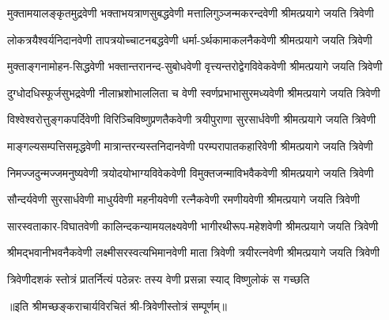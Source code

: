 
\twolineshloka
{मुक्तामयालङ्कृतमुद्रवेणी भक्ताभयत्राणसुबद्धवेणी}
{मत्तालिगुञ्जन्मकरन्दवेणी श्रीमत्प्रयागे जयति त्रिवेणी}%

\twolineshloka
{लोकत्रयैश्वर्यनिदानवेणी तापत्रयोच्चाटनबद्धवेणी}
{धर्मा-ऽर्थकामाकलनैकवेणी श्रीमत्प्रयागे जयति त्रिवेणी}%

\twolineshloka
{मुक्ताङ्गनामोहन-सिद्धवेणी भक्तान्तरानन्द-सुबोधवेणी}
{वृत्त्यन्तरोद्वेगविवेकवेणी श्रीमत्प्रयागे जयति त्रिवेणी}%

\twolineshloka
{दुग्धोदधिस्फूर्जसुभद्रवेणी नीलाभ्रशोभाललिता च वेणी}
{स्वर्णप्रभाभासुरमध्यवेणी श्रीमत्प्रयागे जयति त्रिवेणी}%

\twolineshloka
{विश्वेश्वरोत्तुङ्गकपर्दिवेणी विरिञ्चिविष्णुप्रणतैकवेणी}
{त्रयीपुराणा सुरसार्धवेणी श्रीमत्प्रयागे जयति त्रिवेणी}%

\twolineshloka
{माङ्गल्यसम्पत्तिसमृद्धवेणी मात्रान्तरन्यस्तनिदानवेणी}
{परम्परापातकहारिवेणी श्रीमत्प्रयागे जयति त्रिवेणी}%

\twolineshloka
{निमज्जदुन्मज्जमनुष्यवेणी त्रयोदयोभाग्यविवेकवेणी}
{विमुक्तजन्माविभवैकवेणी श्रीमत्प्रयागे जयति त्रिवेणी}%

\twolineshloka
{सौन्दर्यवेणी सुरसार्धवेणी माधुर्यवेणी महनीयवेणी}
{रत्नैकवेणी रमणीयवेणी श्रीमत्प्रयागे जयति त्रिवेणी}%

\twolineshloka
{सारस्वताकार-विघातवेणी कालिन्दकन्यामयलक्ष्यवेणी}
{भागीरथीरूप-महेशवेणी श्रीमत्प्रयागे जयति त्रिवेणी}%

\twolineshloka
{श्रीमद्भवानीभवनैकवेणी लक्ष्मीसरस्वत्यभिमानवेणी}
{माता त्रिवेणी त्रयीरत्नवेणी श्रीमत्प्रयागे जयति त्रिवेणी}%

\twolineshloka
{त्रिवेणीदशकं स्तोत्रं प्रातर्नित्यं पठेन्नरः}
{तस्य वेणी प्रसन्ना स्याद् विष्णुलोकं स गच्छति}%

॥इति श्रीमच्छङ्कराचार्यविरचितं श्री-त्रिवेणीस्तोत्रं सम्पूर्णम्॥